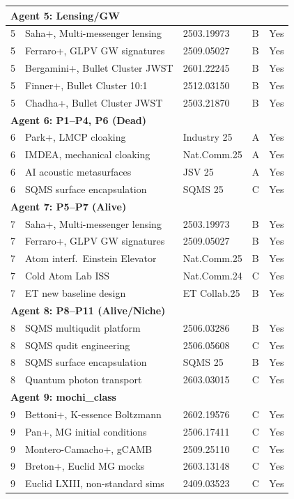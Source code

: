 \documentclass[11pt]{article}
\begin{document}
\begin{longtable}{p{}p{}p{}p{}p{}}
\multicolumn{5}{l}{\textbf{Agent 5: Lensing/GW}} \\
\midrule
5 & Saha+, Multi-messenger lensing & 2503.19973 & B & Yes \\
5 & Ferraro+, GLPV GW signatures & 2509.05027 & B & Yes \\
5 & Bergamini+, Bullet Cluster JWST & 2601.22245 & B & Yes \\
5 & Finner+, Bullet Cluster 10:1 & 2512.03150 & B & Yes \\
5 & Chadha+, Bullet Cluster JWST & 2503.21870 & B & Yes \\
\midrule

\multicolumn{5}{l}{\textbf{Agent 6: P1--P4, P6 (Dead)}} \\
\midrule
6 & Park+, LMCP cloaking & Industry 25 & A & Yes \\
6 & IMDEA, mechanical cloaking & Nat.Comm.25 & A & Yes \\
6 & AI acoustic metasurfaces & JSV 25 & A & Yes \\
6 & SQMS surface encapsulation & SQMS 25 & C & Yes \\
\midrule

\multicolumn{5}{l}{\textbf{Agent 7: P5--P7 (Alive)}} \\
\midrule
7 & Saha+, Multi-messenger lensing & 2503.19973 & B & Yes \\
7 & Ferraro+, GLPV GW signatures & 2509.05027 & B & Yes \\
7 & Atom interf.\ Einstein Elevator & Nat.Comm.25 & B & Yes \\
7 & Cold Atom Lab ISS & Nat.Comm.24 & C & Yes \\
7 & ET new baseline design & ET Collab.25 & B & Yes \\
\midrule

\multicolumn{5}{l}{\textbf{Agent 8: P8--P11 (Alive/Niche)}} \\
\midrule
8 & SQMS multiqudit platform & 2506.03286 & B & Yes \\
8 & SQMS qudit engineering & 2506.05608 & C & Yes \\
8 & SQMS surface encapsulation & SQMS 25 & B & Yes \\
8 & Quantum photon transport & 2603.03015 & C & Yes \\
\midrule

\multicolumn{5}{l}{\textbf{Agent 9: mochi\_class}} \\
\midrule
9 & Bettoni+, K-essence Boltzmann & 2602.19576 & C & Yes \\
9 & Pan+, MG initial conditions & 2506.17411 & C & Yes \\
9 & Montero-Camacho+, gCAMB & 2509.25110 & C & Yes \\
9 & Breton+, Euclid MG mocks & 2603.13148 & C & Yes \\
9 & Euclid LXIII, non-standard sims & 2409.03523 & C & Yes \\
\midrule


\end{longtable}
\end{document}

